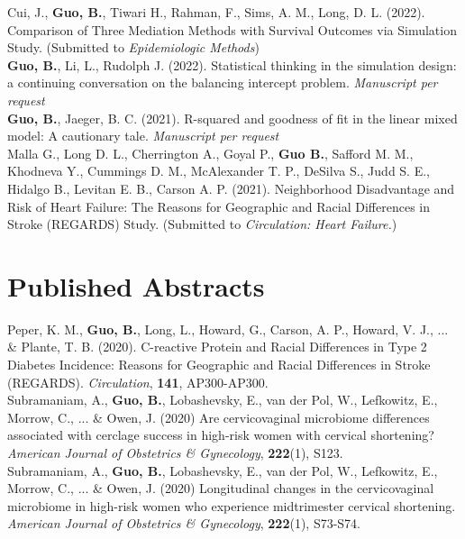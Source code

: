 Cui, J., \textbf{Guo, B.}, Tiwari H., Rahman, F., Sims, A. M., Long, D. L. (2022). Comparison of Three Mediation Methods with Survival Outcomes via Simulation Study. (Submitted to \textit{Epidemiologic Methods})\\

\textbf{Guo, B.}, Li, L., Rudolph J. (2022). Statistical thinking in the simulation design: a continuing conversation on the balancing intercept problem. {\it Manuscript per request}\\

\textbf{Guo, B.}, Jaeger, B. C. (2021). R-squared and goodness of fit in the linear mixed model: A cautionary tale. {\it Manuscript per request}\\

Malla G., Long D. L., Cherrington A., Goyal P., \textbf{Guo B.}, Safford M. M., Khodneva Y., Cummings D. M., McAlexander T. P., DeSilva S., Judd S. E., Hidalgo B., Levitan E. B., Carson A. P. (2021). Neighborhood Disadvantage and Risk of Heart Failure: The Reasons for Geographic and Racial Differences in Stroke (REGARDS) Study. (Submitted to \textit{Circulation: Heart Failure.})\\



\section{Published Abstracts}
Peper, K. M., \textbf{Guo, B.}, Long, L., Howard, G., Carson, A. P., Howard, V. J., ... \& Plante, T. B.  (2020). C-reactive Protein and Racial Differences in Type 2 Diabetes Incidence: Reasons for Geographic and Racial Differences in Stroke (REGARDS). \textit{Circulation}, {\bf 141}, AP300-AP300. \\

Subramaniam, A., \textbf{Guo, B.}, Lobashevsky, E., van der Pol, W., Lefkowitz, E., Morrow, C., ... \& Owen, J.  (2020) Are cervicovaginal microbiome differences associated with cerclage success in high-risk women with cervical shortening? \textit{American Journal of Obstetrics \& Gynecology}, {\bf 222}(1), S123.\\

Subramaniam, A., \textbf{Guo, B.}, Lobashevsky, E., van der Pol, W., Lefkowitz, E., Morrow, C., ... \& Owen, J.  (2020)  Longitudinal changes in the cervicovaginal microbiome in high-risk women who experience midtrimester cervical shortening. \textit{American Journal of Obstetrics \& Gynecology}, {\bf 222}(1), S73-S74.\\

